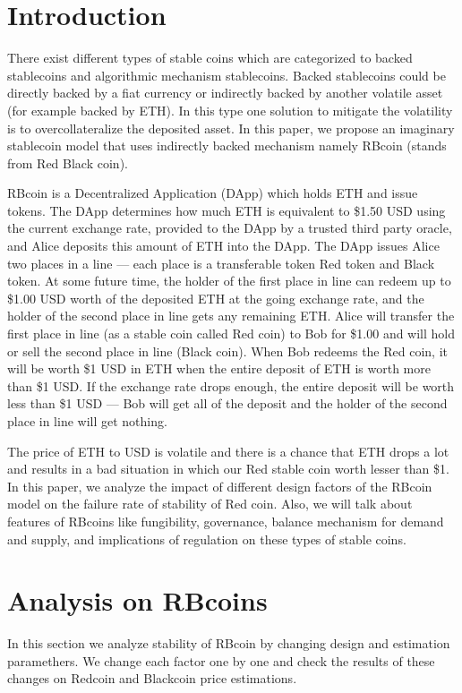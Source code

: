 
\section{Introduction}
There exist different types of stable coins which are categorized to backed stablecoins and algorithmic mechanism stablecoins. Backed stablecoins could be directly backed by a fiat currency or indirectly backed by another volatile asset (for example backed by ETH). In this type one solution to mitigate the volatility is to overcollateralize the deposited asset. In this paper, we propose an imaginary stablecoin model that uses indirectly backed mechanism namely RBcoin (stands from Red Black coin).

RBcoin is a Decentralized Application (DApp) which holds ETH and issue tokens. The DApp determines how much ETH is equivalent to \$1.50 USD using the current exchange rate, provided to the DApp by a trusted third party oracle, and Alice deposits this amount of ETH into the DApp. The DApp issues Alice two places in a line — each place is a transferable token Red token and Black token. At some future time, the holder of the first place in line can redeem up to \$1.00 USD worth of the deposited ETH at the going exchange rate, and the holder of the second place in line gets any remaining ETH. Alice will transfer the first place in line (as a stable coin called Red coin) to Bob for \$1.00 and will hold or sell the second place in line (Black coin). When Bob redeems the Red coin, it will be worth \$1 USD in ETH when the entire deposit of ETH is worth more than \$1 USD. If the exchange rate drops enough, the entire deposit will be worth less than \$1 USD — Bob will get all of the deposit and the holder of the second place in line will get nothing.

The price of ETH to USD is volatile and there is a chance that ETH drops a lot and results in a bad situation in which our Red stable coin worth lesser than \$1. In this paper, we analyze the impact of different design factors of the RBcoin model on the failure rate of stability of Red coin. Also, we will talk about features of RBcoins like fungibility, governance, balance mechanism for demand and supply, and implications of regulation on these types of stable coins. 
\section{Analysis on RBcoins}

In this section we analyze stability of RBcoin by changing design and estimation paramethers. We change each factor one by one and check the results of these changes on Redcoin and Blackcoin price estimations.

